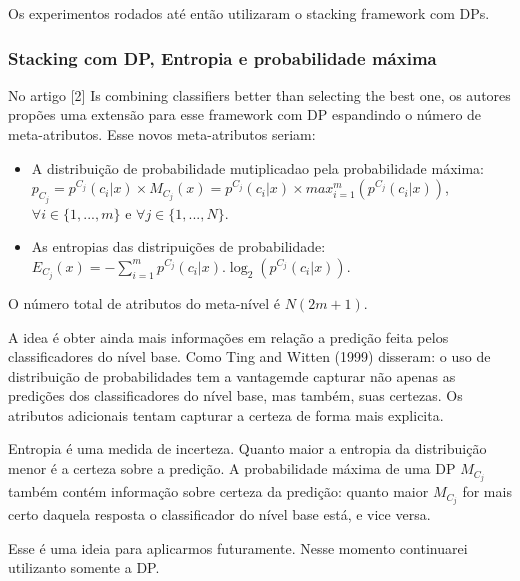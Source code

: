 \documentclass[]{article}
\begin{document}
Os experimentos rodados até então utilizaram o stacking framework com
DPs.

\subsubsection{Stacking com DP, Entropia e probabilidade
máxima}\label{stacking-com-dp-entropia-e-probabilidade-maxima}

No artigo {[}2{]} Is combining classifiers better than selecting the
best one, os autores propões uma extensão para esse framework com DP
espandindo o número de meta-atributos. Esse novos meta-atributos seriam:

\begin{itemize}
\item
  A distribuição de probabilidade mutiplicadao pela probabilidade
  máxima:
  \(p_{C_j} = p^{C_j}(c_i|x) \times M_{C_j}(x) = p^{C_j}(c_i|x) \times max_{i=1}^{m}(p^{C_j}(c_i|x))\),
  \(\forall i \in \{1,...,m\}\) e \(\forall j \in \{1,...,N\}\).
\item
  As entropias das distripuições de probabilidade:
  \(E_{C_j}(x) = -\sum_{i=1}^{m}p^{C_j}(c_i|x).\log_2(p^{C_j}(c_i|x))\).
\end{itemize}

O número total de atributos do meta-nível é \(N(2m+1)\).

A idea é obter ainda mais informações em relação a predição feita pelos
classificadores do nível base. Como Ting and Witten (1999) disseram: o
uso de distribuição de probabilidades tem a vantagemde capturar não
apenas as predições dos classificadores do nível base, mas também, suas
certezas. Os atributos adicionais tentam capturar a certeza de forma
mais explicita.

Entropia é uma medida de incerteza. Quanto maior a entropia da
distribuição menor é a certeza sobre a predição. A probabilidade máxima
de uma DP \(M_{C_j}\) também contém informação sobre certeza da
predição: quanto maior \(M_{C_j}\) for mais certo daquela resposta o
classificador do nível base está, e vice versa.

Esse é uma ideia para aplicarmos futuramente. Nesse momento continuarei
utilizanto somente a DP.
\end{document}

